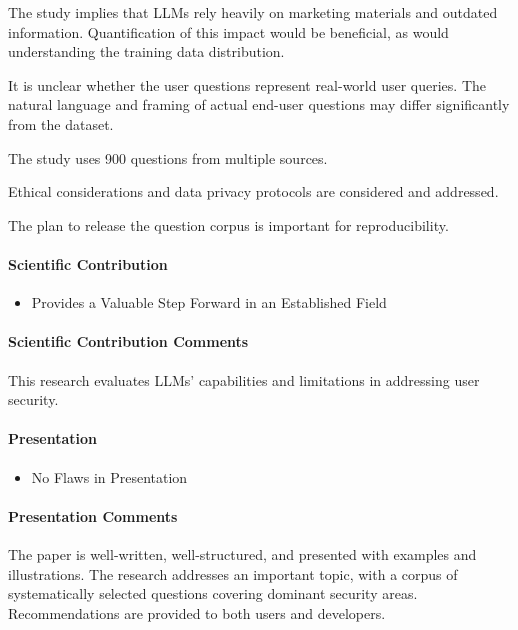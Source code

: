 \documentclass[letterpaper,twocolumn,10pt]{article}
\begin{document}
The study implies that LLMs rely heavily on marketing materials and outdated information. Quantification of this impact would be beneficial, as would understanding the training data distribution.

It is unclear whether the user questions represent real-world user queries. The natural language and framing of actual end-user questions may differ significantly from the dataset.

The study uses 900 questions from multiple sources.

Ethical considerations and data privacy protocols are considered and addressed.

The plan to release the question corpus is important for reproducibility.

\paragraph{Scientific Contribution}
\begin{itemize}
    \item Provides a Valuable Step Forward in an Established Field
\end{itemize}

\paragraph{Scientific Contribution Comments}
This research evaluates LLMs' capabilities and limitations in addressing user security.

\paragraph{Presentation}
\begin{itemize}
    \item No Flaws in Presentation
\end{itemize}

\paragraph{Presentation Comments}
The paper is well-written, well-structured, and presented with examples and illustrations. The research addresses an important topic, with a corpus of systematically selected questions covering dominant security areas. Recommendations are provided to both users and developers.
\end{document}
